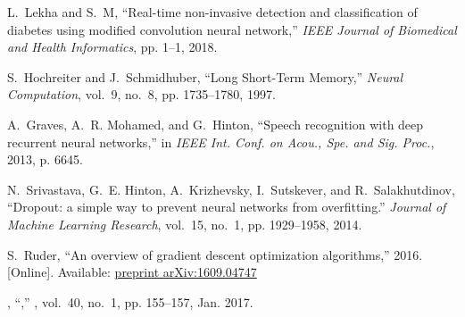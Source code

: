 \documentclass[a4paper, 10 pt, twocolumn]{IEEEtran}
\begin{document}
\begin{thebibliography}{10}
L.~Lekha and S.~M, ``Real-time non-invasive detection and classification of
  diabetes using modified convolution neural network,'' \emph{IEEE Journal of
  Biomedical and Health Informatics}, pp. 1--1, 2018.

S.~Hochreiter and J.~Schmidhuber, ``{Long Short-Term Memory},'' \emph{Neural
  Computation}, vol.~9, no.~8, pp. 1735--1780, 1997.

A.~Graves, A.~R. Mohamed, and G.~Hinton, ``Speech recognition with deep
  recurrent neural networks,'' in \emph{IEEE Int. Conf. on Acou., Spe. and Sig.
  Proc.}, 2013, p. 6645.

N.~Srivastava, G.~E. Hinton, A.~Krizhevsky, I.~Sutskever, and R.~Salakhutdinov,
  ``Dropout: a simple way to prevent neural networks from overfitting.''
  \emph{Journal of Machine Learning Research}, vol.~15, no.~1, pp. 1929--1958,
  2014.

\BIBentryALTinterwordspacing
S.~Ruder, ``An overview of gradient descent optimization algorithms,'' 2016.
  [Online]. Available: \url{preprint arXiv:1609.04747}
\BIBentrySTDinterwordspacing

, ``,'' \emph{}, vol.~40, no.~1, pp. 155--157, Jan. 2017.

\end{thebibliography}
\end{document}
